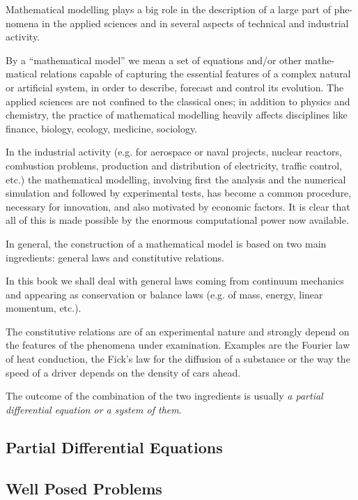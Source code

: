 \documentclass[../main.tex]{subfiles}
\begin{document}
Mathematical modelling plays a big role in the description of a large part of phe- nomena in the applied sciences and in several aspects of technical and industrial activity.

By a “mathematical model” we mean a set of equations and/or other mathe- matical relations capable of capturing the essential features of a complex natural or artificial system, in order to describe, forecast and control its evolution. The applied sciences are not confined to the classical ones; in addition to physics and chemistry, the practice of mathematical modelling heavily affects disciplines like finance, biology, ecology, medicine, sociology.

In the industrial activity (e.g. for aerospace or naval projects, nuclear reactors, combustion problems, production and distribution of electricity, traffic control, etc.) the mathematical modelling, involving first the analysis and the numerical simulation and followed by experimental tests, has become a common procedure, necessary for innovation, and also motivated by economic factors. It is clear that all of this is made possible by the enormous computational power now available.

In general, the construction of a mathematical model is based on two main ingredients: general laws and constitutive relations.

In this book we shall deal with general laws coming from continuum mechanics and appearing as conservation or balance laws (e.g. of mass, energy, linear momentum, etc.).

The constitutive relations are of an experimental nature and strongly depend on the features of the phenomena under examination. Examples are the Fourier law of heat conduction, the Fick’s law for the diffusion of a substance or the way the speed of a driver depends on the density of cars ahead.

The outcome of the combination of the two ingredients is usually \textit{a partial differential equation or a system of them}.

\subsection{Partial Differential Equations}

\subsection{Well Posed Problems}
\end{document}
